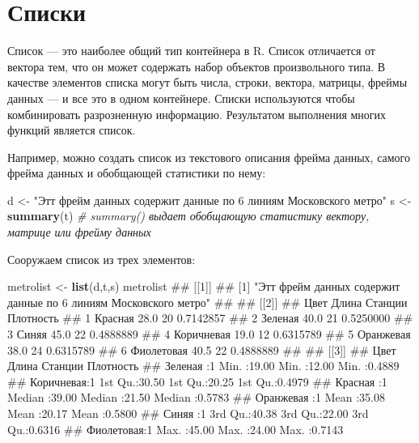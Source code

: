 \documentclass[]{book}
\newenvironment{Shaded}{\begin{snugshade}}{\end{snugshade}}
\newcommand{\KeywordTok}[1]{\textcolor[rgb]{0.13,0.29,0.53}{\textbf{#1}}}
\newcommand{\StringTok}[1]{\textcolor[rgb]{0.31,0.60,0.02}{#1}}
\newcommand{\CommentTok}[1]{\textcolor[rgb]{0.56,0.35,0.01}{\textit{#1}}}
\newcommand{\NormalTok}[1]{#1}
\begin{document}
\section{Списки}\label{lists}

Список --- это наиболее общий тип контейнера в R. Список отличается от
вектора тем, что он может содержать набор объектов произвольного типа. В
качестве элементов списка могут быть числа, строки, вектора, матрицы,
фреймы данных --- и все это в одном контейнере. Списки используются
чтобы комбинировать разрозненную информацию. Результатом выполнения
многих функций является список.

Например, можно создать список из текстового описания фрейма данных,
самого фрейма данных и обобщающей статистики по нему:

\begin{Shaded}
\begin{Highlighting}[]
\NormalTok{d <-}\StringTok{ "Этт фрейм данных содержит данные по 6 линиям Московского метро"}
\NormalTok{s <-}\StringTok{ }\KeywordTok{summary}\NormalTok{(t)  }\CommentTok{# summary() выдает обобщающую статистику вектору, матрице или фрейму данных}
\end{Highlighting}
\end{Shaded}

Сооружаем список из трех элементов:

\begin{Shaded}
\begin{Highlighting}[]
\NormalTok{metrolist <-}\StringTok{ }\KeywordTok{list}\NormalTok{(d,t,s)}
\NormalTok{metrolist}
\NormalTok{## [[1]]}
\NormalTok{## [1] "Этт фрейм данных содержит данные по 6 линиям Московского метро"}
\NormalTok{## }
\NormalTok{## [[2]]}
\NormalTok{##         Цвет Длина Станции Плотность}
\NormalTok{## 1    Красная  28.0      20 0.7142857}
\NormalTok{## 2    Зеленая  40.0      21 0.5250000}
\NormalTok{## 3      Синяя  45.0      22 0.4888889}
\NormalTok{## 4 Коричневая  19.0      12 0.6315789}
\NormalTok{## 5  Оранжевая  38.0      24 0.6315789}
\NormalTok{## 6 Фиолетовая  40.5      22 0.4888889}
\NormalTok{## }
\NormalTok{## [[3]]}
\NormalTok{##          Цвет       Длина          Станции        Плотность     }
\NormalTok{##  Зеленая   :1   Min.   :19.00   Min.   :12.00   Min.   :0.4889  }
\NormalTok{##  Коричневая:1   1st Qu.:30.50   1st Qu.:20.25   1st Qu.:0.4979  }
\NormalTok{##  Красная   :1   Median :39.00   Median :21.50   Median :0.5783  }
\NormalTok{##  Оранжевая :1   Mean   :35.08   Mean   :20.17   Mean   :0.5800  }
\NormalTok{##  Синяя     :1   3rd Qu.:40.38   3rd Qu.:22.00   3rd Qu.:0.6316  }
\NormalTok{##  Фиолетовая:1   Max.   :45.00   Max.   :24.00   Max.   :0.7143}
\end{Highlighting}
\end{Shaded}
\end{document}
